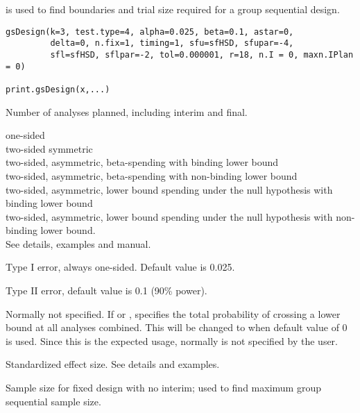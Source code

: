 \begin{Description}\relax
{} is used to find boundaries and trial size required for a group sequential design.
\end{Description}
\begin{Usage}
\begin{verbatim}
gsDesign(k=3, test.type=4, alpha=0.025, beta=0.1, astar=0,  
         delta=0, n.fix=1, timing=1, sfu=sfHSD, sfupar=-4,
         sfl=sfHSD, sflpar=-2, tol=0.000001, r=18, n.I = 0, maxn.IPlan = 0) 

print.gsDesign(x,...)\end{verbatim}
\end{Usage}
\begin{Arguments}
\begin{ldescription}
\item[\code{k}] Number of analyses planned, including interim and final.
\item[\code{test.type}] one-sided \\
two-sided symmetric \\
two-sided, asymmetric, beta-spending with binding lower bound \\
two-sided, asymmetric, beta-spending with non-binding lower bound \\
two-sided, asymmetric, lower bound spending under the null hypothesis with binding lower bound \\
two-sided, asymmetric, lower bound spending under the null hypothesis with non-binding lower bound. \\ See details, examples and manual.
\item[\code{alpha}] Type I error, always one-sided. Default value is 0.025.
\item[\code{beta}] Type II error, default value is 0.1 (90\% power).
\item[\code{astar}] Normally not specified. If  or ,  specifies the total
probability of crossing a lower bound at all analyses combined. 
This will be changed to  when default value of 0 is used. 
Since this is the expected usage, normally  is not specified by the user.
\item[\code{delta}] Standardized effect size. See details and examples.
\item[\code{n.fix}] Sample size for fixed design with no interim; used to find maximum group sequential sample size.

\end{ldescription}
\end{Arguments}
